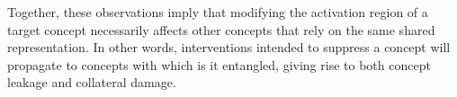Together, these observations imply that modifying the activation region of a target concept necessarily affects other concepts that rely on the same shared representation. In other words, interventions intended to suppress a concept will propagate to concepts with which is it entangled, giving rise to both concept leakage and collateral damage. 

